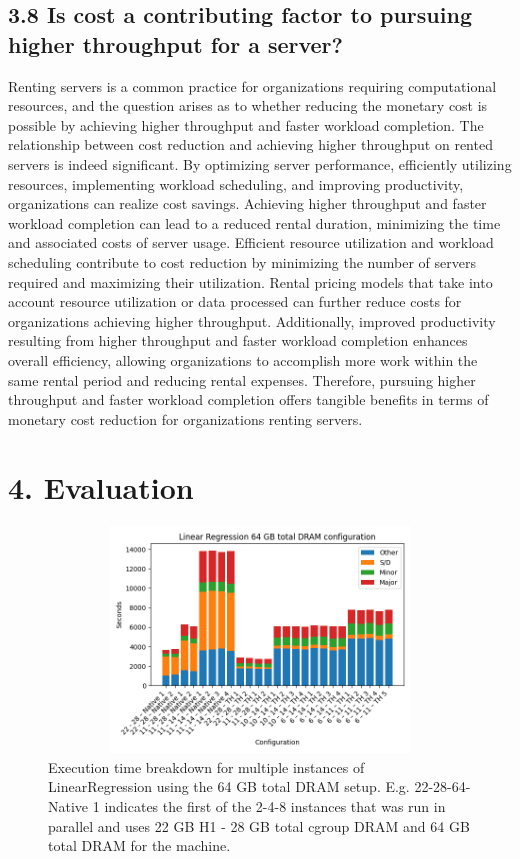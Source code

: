 \documentclass[twocolumn,10pt]{asme2e}
\begin{document}
\subsection*{3.8 Is cost a contributing factor to pursuing higher throughput for a server?}
Renting servers is a common practice for organizations requiring computational resources, and the question arises as to whether reducing the monetary cost is possible by achieving higher throughput and faster workload completion. The relationship between cost reduction and achieving higher throughput on rented servers is indeed significant. By optimizing server performance, efficiently utilizing resources, implementing workload scheduling, and improving productivity, organizations can realize cost savings. Achieving higher throughput and faster workload completion can lead to a reduced rental duration, minimizing the time and associated costs of server usage. Efficient resource utilization and workload scheduling contribute to cost reduction by minimizing the number of servers required and maximizing their utilization. Rental pricing models that take into account resource utilization or data processed can further reduce costs for organizations achieving higher throughput. Additionally, improved productivity resulting from higher throughput and faster workload completion enhances overall efficiency, allowing organizations to accomplish more work within the same rental period and reducing rental expenses. Therefore, pursuing higher throughput and faster workload completion offers tangible benefits in terms of monetary cost reduction for organizations renting servers.
\section*{4. Evaluation}
\begin{figure}[h!]
	\includegraphics[width=13cm,height=6cm]{lr64.png}
	\caption{Execution time breakdown for multiple instances of LinearRegression using the 64 GB total DRAM setup. 
	E.g. 22-28-64-Native 1 indicates the first of the 2-4-8 instances that was run in parallel and uses 22 GB H1 - 28 GB total cgroup DRAM and 64 GB total DRAM for the machine.}
	\label{fig:lr64}
\end{figure}
\end{document}
